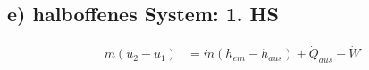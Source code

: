 \subsection*{e) halboffenes System: 1. HS}

\begin{align*}
    m(u_2 - u_1) &= \dot{m} (h_{ein} - h_{aus}) + \dot{Q}_{aus} - \dot{W}
\end{align*}